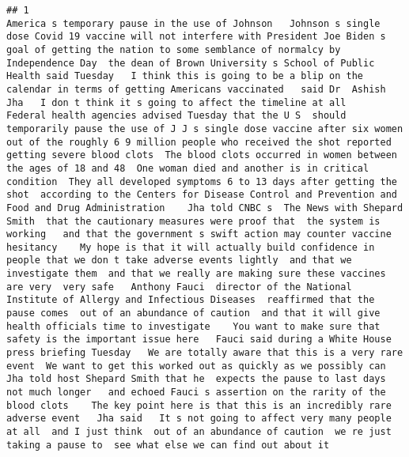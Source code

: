 \documentclass[
]{article}
\begin{document}
\begin{verbatim}
## 1                                                                                                                                                                                                                                                                                                                                                                                               America s temporary pause in the use of Johnson   Johnson s single dose Covid 19 vaccine will not interfere with President Joe Biden s goal of getting the nation to some semblance of normalcy by Independence Day  the dean of Brown University s School of Public Health said Tuesday   I think this is going to be a blip on the calendar in terms of getting Americans vaccinated   said Dr  Ashish Jha   I don t think it s going to affect the timeline at all    Federal health agencies advised Tuesday that the U S  should temporarily pause the use of J J s single dose vaccine after six women out of the roughly 6 9 million people who received the shot reported getting severe blood clots  The blood clots occurred in women between the ages of 18 and 48  One woman died and another is in critical condition  They all developed symptoms 6 to 13 days after getting the shot  according to the Centers for Disease Control and Prevention and Food and Drug Administration    Jha told CNBC s  The News with Shepard Smith  that the cautionary measures were proof that  the system is working   and that the government s swift action may counter vaccine hesitancy    My hope is that it will actually build confidence in people that we don t take adverse events lightly  and that we investigate them  and that we really are making sure these vaccines are very  very safe   Anthony Fauci  director of the National Institute of Allergy and Infectious Diseases  reaffirmed that the pause comes  out of an abundance of caution  and that it will give health officials time to investigate    You want to make sure that safety is the important issue here   Fauci said during a White House press briefing Tuesday   We are totally aware that this is a very rare event  We want to get this worked out as quickly as we possibly can   Jha told host Shepard Smith that he  expects the pause to last days  not much longer   and echoed Fauci s assertion on the rarity of the blood clots    The key point here is that this is an incredibly rare  adverse event   Jha said   It s not going to affect very many people at all  and I just think  out of an abundance of caution  we re just taking a pause to  see what else we can find out about it  

\end{verbatim}
\end{document}
